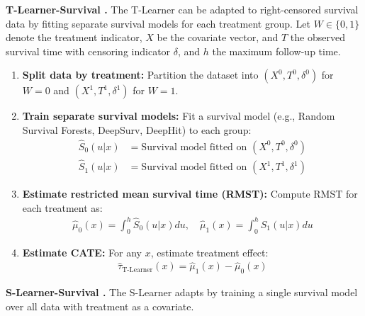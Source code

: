 \documentclass{article} %
\begin{document}
\textbf{T-Learner-Survival \citep{bo2024ameta, noroozizadeh2025impact}.}
The T-Learner can be adapted to right-censored survival data by fitting separate survival models for each treatment group. Let $W \in \{0, 1\}$ denote the treatment indicator, $X$ be the covariate vector, and $T$ the observed survival time with censoring indicator $\delta$, and $h$ the maximum follow-up time.

\begin{enumerate}[leftmargin=20pt, itemsep=0pt]
    \item \textbf{Split data by treatment:} Partition the dataset into $(X^0, T^0, \delta^0)$ for $W=0$ and $(X^1, T^1, \delta^1)$ for $W=1$.
    \item \textbf{Train separate survival models:} Fit a survival model (e.g., Random Survival Forests, DeepSurv, DeepHit) to each group:
    \begin{align*}
        \widehat{S}_0(u | x) &= \text{Survival model fitted on } (X^0, T^0, \delta^0) \\
        \widehat{S}_1(u | x) &= \text{Survival model fitted on } (X^1, T^1, \delta^1)
    \end{align*}
    \item \textbf{Estimate restricted mean survival time (RMST):} Compute RMST for each treatment as:
    \begin{align*}
        \widehat{\mu}_0(x) = \int_0^h \widehat{S}_0(u|x) du, \quad \widehat{\mu}_1(x) = \int_0^h \widehat{S}_1(u|x) du
    \end{align*}
    \item \textbf{Estimate CATE:} For any $x$, estimate treatment effect:
    \begin{align*}
        \widehat{\tau}_{\text{T-Learner}}(x) = \widehat{\mu}_1(x) - \widehat{\mu}_0(x)
    \end{align*}
\end{enumerate}

\textbf{S-Learner-Survival \citep{bo2024ameta, noroozizadeh2025impact}.}
The S-Learner adapts by training a single survival model over all data with treatment as a covariate.
\end{document}
